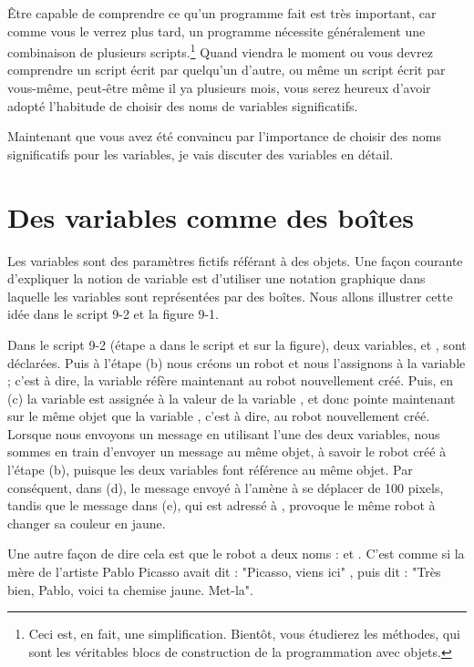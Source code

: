 \documentclass[a4paper,10pt,twoside]{book}
\begin{document}
\^Etre capable de comprendre ce qu'un programme fait est tr\`es important, car comme vous le verrez plus tard, un programme n\'ecessite g\'en\'eralement une combinaison de plusieurs scripts.\footnote{Ceci est, en fait, une simplification. Bient\^ot, vous \'etudierez les m\'ethodes, qui sont les v\'eritables blocs de construction de la programmation avec objets.} Quand viendra le moment ou vous devrez comprendre un script \'ecrit par quelqu'un d'autre, ou m\^eme un script \'ecrit par vous-m\^eme, peut-\^etre m\^eme il ya plusieurs mois, vous serez heureux d'avoir adopt\'e l'habitude de choisir des noms de variables significatifs. 

Maintenant que vous avez \'et\'e convaincu par l'importance de choisir des noms significatifs pour les variables, je vais discuter des variables en d\'etail.

\section*{Des variables comme des bo\^ites}

Les variables sont des param\`etres fictifs  r\'ef\'erant \`a des objets. Une fa\c con courante d'expliquer la notion de variable est d'utiliser une notation graphique dans laquelle les variables sont repr\'esent\'ees par des bo\^ites. Nous allons illustrer cette id\'ee dans le script 9-2 et la figure 9-1. 

Dans le script 9-2 (\'etape a dans le script et sur la figure), deux variables,  et , sont d\'eclar\'ees. Puis \`a l'\'etape (b) nous cr\'eons un robot et nous l'assignons \`a la variable ; c'est \`a dire, la variable  r\'ef\`ere maintenant au robot nouvellement cr\'e\'e. Puis, en (c) la variable  est assign\'ee \`a la valeur de la variable , et donc  pointe maintenant sur le m\^eme objet que la variable  , c'est \`a dire, au robot nouvellement cr\'e\'e. Lorsque nous envoyons un message en utilisant l'une des deux variables, nous sommes en train d'envoyer un message au m\^eme objet, \`a savoir le robot cr\'e\'e \`a l'\'etape (b), puisque les deux variables font r\'ef\'erence au m\^eme objet. Par cons\'equent, dans (d), le message envoy\'e \`a  l'am\`ene \`a se d\'eplacer de 100 pixels, tandis que le message dans (e), qui est adress\'e \`a , provoque le m\^eme robot \`a changer sa couleur en jaune. 

Une autre fa\c con de dire cela est que le robot a deux noms :   et .  C'est comme si la m\`ere de l'artiste Pablo Picasso avait dit : "Picasso, viens ici" , puis dit : "Tr\`es bien, Pablo, voici ta chemise jaune. Met-la". 
\end{document}
